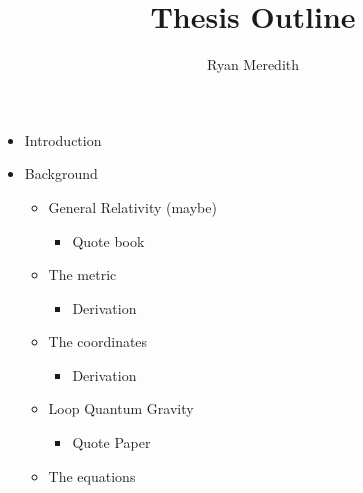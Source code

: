 \documentclass[12pt]{article}
\title{Thesis Outline}
\author{Ryan Meredith}
\begin{document}
\maketitle

\begin{itemize}

    \item Introduction

    \item Background

        \begin{itemize}

            \item General Relativity (maybe)

                \begin{itemize}

                    \item Quote book

                \end{itemize}

            \item The metric

                \begin{itemize}

                    \item Derivation

                \end{itemize}

            \item The coordinates

                \begin{itemize}

                    \item Derivation

                \end{itemize}

            \item Loop Quantum Gravity

                \begin{itemize}

                    \item Quote Paper

                \end{itemize}

            \item The equations

                \begin{itemize}


\end{itemize}
\end{itemize}
\end{itemize}
\end{document}
